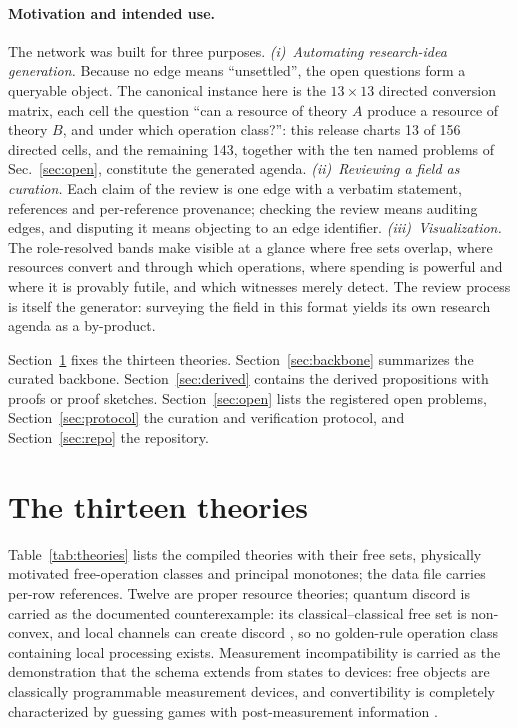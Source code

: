\documentclass[11pt,a4paper]{article}
\theoremstyle{definition}
\begin{document}
\paragraph{Motivation and intended use.}
The network was built for three purposes. \emph{(i)~Automating research-idea
generation.} Because no edge means ``unsettled'', the open questions form a
queryable object. The canonical instance here is the $13\times13$ directed
conversion matrix, each cell the question ``can a resource of theory $A$
produce a resource of theory $B$, and under which operation class?'': this
release charts 13 of 156 directed cells, and the remaining 143, together with
the ten named problems of Sec.~\ref{sec:open}, constitute the generated
agenda. \emph{(ii)~Reviewing a field as curation.} Each claim of the review
is one edge with a verbatim statement, references and per-reference
provenance; checking the review means auditing edges, and disputing it means
objecting to an edge identifier. \emph{(iii)~Visualization.} The
role-resolved bands make visible at a glance where free sets overlap, where
resources convert and through which operations, where spending is powerful
and where it is provably futile, and which witnesses merely detect. The
review process is itself the generator: surveying the field in this format
yields its own research agenda as a by-product.

Section~\ref{sec:theories} fixes the thirteen theories.
Section~\ref{sec:backbone} summarizes the curated backbone.
Section~\ref{sec:derived} contains the derived propositions with proofs or
proof sketches. Section~\ref{sec:open} lists the registered open problems,
Section~\ref{sec:protocol} the curation and verification protocol, and
Section~\ref{sec:repo} the repository.

\section{The thirteen theories}\label{sec:theories}

Table~\ref{tab:theories} lists the compiled theories with their free sets,
physically motivated free-operation classes and principal monotones; the data
file carries per-row references. Twelve are proper resource theories; quantum
discord is carried as the documented counterexample: its classical--classical
free set is non-convex, and local channels can create discord
\cite{modi2012,ciccarello2012}, so no golden-rule operation class containing
local processing exists. Measurement incompatibility is carried as the
demonstration that the schema extends from states to devices: free objects
are classically programmable measurement devices, and convertibility is
completely characterized by guessing games with post-measurement information
\cite{bcz2020}.
\end{document}
